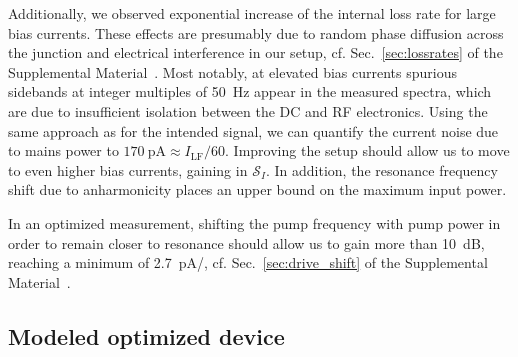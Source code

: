 Additionally, we observed exponential increase of the internal loss rate for large bias currents.
% 
These effects are presumably due to random phase diffusion across the junction and electrical interference in our setup, cf. Sec.~\ref{sec:lossrates} of the Supplemental Material~\cite{SeeSupplementalMaterial}.
% 
Most notably, at elevated bias currents spurious sidebands at integer multiples of \SI{50}{\hertz} appear in the measured spectra, which are due to insufficient isolation between the DC and RF electronics.
% 
Using the same approach as for the intended signal, we can quantify the current noise due to mains power to $\SI{170}{\pico\ampere}\approx I_\text{LF}/60$.
% 
Improving the setup should allow us to move to even higher bias currents, gaining in $\mathcal{S}_I$.
% 
In addition, the resonance frequency shift due to anharmonicity places an upper bound on the maximum input power.

In an optimized measurement, shifting the pump frequency with pump power in order to remain closer to resonance should allow us to gain more than \SI{10}{dB}, reaching a minimum of \SI{2.7}{\pico\ampere/\sqrthz}, cf. Sec.~\ref{sec:drive_shift} of the Supplemental Material~\cite{SeeSupplementalMaterial}.

\subsection{Modeled optimized device}


